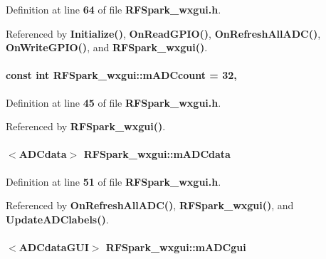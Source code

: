 Definition at line {\bf 64} of file {\bf R\+F\+Spark\+\_\+wxgui.\+h}.



Referenced by {\bf Initialize()}, {\bf On\+Read\+G\+P\+I\+O()}, {\bf On\+Refresh\+All\+A\+D\+C()}, {\bf On\+Write\+G\+P\+I\+O()}, and {\bf R\+F\+Spark\+\_\+wxgui()}.

\paragraph[{m\+A\+D\+Ccount}]{\setlength{\rightskip}{0pt plus 5cm}const {\bf int} R\+F\+Spark\+\_\+wxgui\+::m\+A\+D\+Ccount = 32\hspace{0.3cm}{\ttfamily [static]}, {\ttfamily [protected]}}\label{classRFSpark__wxgui_a187d37db91fe10ed7f3a0101cfbb5155}


Definition at line {\bf 45} of file {\bf R\+F\+Spark\+\_\+wxgui.\+h}.



Referenced by {\bf R\+F\+Spark\+\_\+wxgui()}.

\paragraph[{m\+A\+D\+Cdata}]{$<${\bf A\+D\+Cdata}$>$ R\+F\+Spark\+\_\+wxgui\+::m\+A\+D\+Cdata\hspace{0.3cm}{\ttfamily [protected]}}\label{classRFSpark__wxgui_acf4840b0658edd2d9dfc119bb4d50d2c}


Definition at line {\bf 51} of file {\bf R\+F\+Spark\+\_\+wxgui.\+h}.



Referenced by {\bf On\+Refresh\+All\+A\+D\+C()}, {\bf R\+F\+Spark\+\_\+wxgui()}, and {\bf Update\+A\+D\+Clabels()}.

\paragraph[{m\+A\+D\+Cgui}]{$<${\bf A\+D\+Cdata\+G\+UI}$>$ R\+F\+Spark\+\_\+wxgui\+::m\+A\+D\+Cgui\hspace{0.3cm}{\ttfamily [protected]}}\label{classRFSpark__wxgui_a3713edaf262bcd9bdf12428e64f48740}


